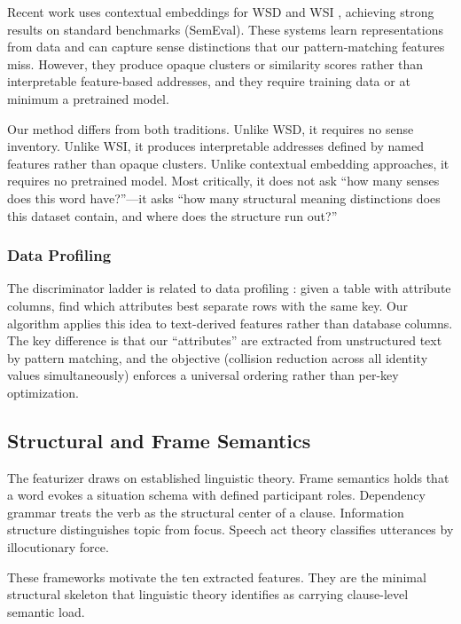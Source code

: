 \documentclass[11pt,a4paper]{article}
\begin{document}
Recent work uses contextual embeddings for WSD \citep{bevilacqua2020,pilehvar2019} and WSI \citep{amrami2018}, achieving strong results on standard benchmarks (SemEval). These systems learn representations from data and can capture sense distinctions that our pattern-matching features miss. However, they produce opaque clusters or similarity scores rather than interpretable feature-based addresses, and they require training data or at minimum a pretrained model.

Our method differs from both traditions. Unlike WSD, it requires no sense inventory. Unlike WSI, it produces interpretable addresses defined by named features rather than opaque clusters. Unlike contextual embedding approaches, it requires no pretrained model. Most critically, it does not ask ``how many senses does this word have?''---it asks ``how many structural meaning distinctions does this dataset contain, and where does the structure run out?''

\subsubsection{Data Profiling}

The discriminator ladder is related to data profiling \citep{abedjan2015,naumann2014}: given a table with attribute columns, find which attributes best separate rows with the same key. Our algorithm applies this idea to text-derived features rather than database columns. The key difference is that our ``attributes'' are extracted from unstructured text by pattern matching, and the objective (collision reduction across all identity values simultaneously) enforces a universal ordering rather than per-key optimization.

\subsection{Structural and Frame Semantics}

The featurizer draws on established linguistic theory. Frame semantics \citep{fillmore1982} holds that a word evokes a situation schema with defined participant roles. Dependency grammar \citep{tesniere1959} treats the verb as the structural center of a clause. Information structure \citep{halliday1967,lambrecht1994} distinguishes topic from focus. Speech act theory \citep{austin1962,searle1969} classifies utterances by illocutionary force.

These frameworks motivate the ten extracted features. They are the minimal structural skeleton that linguistic theory identifies as carrying clause-level semantic load.
\end{document}
